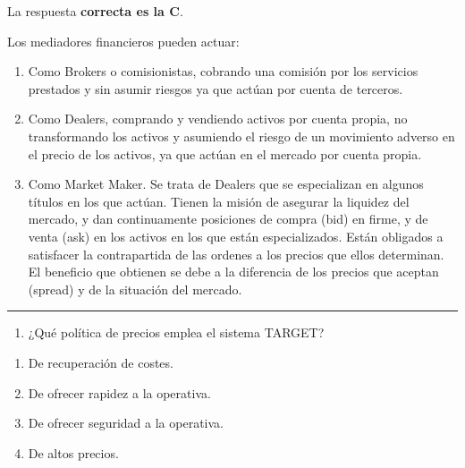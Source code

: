 \documentclass[
  letterpaper,
  DIV=11,
  numbers=noendperiod]{scrreprt}
\providecommand{\tightlist}{%
  \setlength{\itemsep}{0pt}\setlength{\parskip}{0pt}}\usepackage{longtable,booktabs,array}
\begin{document}
\begin{tcolorbox}[enhanced jigsaw, left=2mm, opacityback=0, colback=white, breakable, arc=.35mm, bottomrule=.15mm, rightrule=.15mm, toprule=.15mm, leftrule=.75mm, colframe=quarto-callout-tip-color-frame]
\begin{minipage}[t]{5.5mm}
\textcolor{quarto-callout-tip-color}{\faLightbulb}
\end{minipage}%
\begin{minipage}[t]{\textwidth - 5.5mm}

La respuesta \textbf{correcta es la C}.

Los mediadores financieros pueden actuar:

\begin{enumerate}
\def\labelenumi{\arabic{enumi}.}
\item
  Como Brokers o comisionistas, cobrando una comisión por los servicios
  prestados y sin asumir riesgos ya que actúan por cuenta de terceros.
\item
  Como Dealers, comprando y vendiendo activos por cuenta propia, no
  transformando los activos y asumiendo el riesgo de un movimiento
  adverso en el precio de los activos, ya que actúan en el mercado por
  cuenta propia.
\item
  Como Market Maker. Se trata de Dealers que se especializan en algunos
  títulos en los que actúan. Tienen la misión de asegurar la liquidez
  del mercado, y dan continuamente posiciones de compra (bid) en firme,
  y de venta (ask) en los activos en los que están especializados. Están
  obligados a satisfacer la contrapartida de las ordenes a los precios
  que ellos determinan. El beneficio que obtienen se debe a la
  diferencia de los precios que aceptan (spread) y de la situación del
  mercado.
\end{enumerate}

\end{minipage}%
\end{tcolorbox}

\begin{center}\rule{0.5\linewidth}{0.5pt}\end{center}

\begin{enumerate}
\def\labelenumi{\arabic{enumi}.}
\setcounter{enumi}{7}
\tightlist
\item
  ¿Qué política de precios emplea el sistema TARGET?
\end{enumerate}

\begin{enumerate}
\def\labelenumi{\alph{enumi})}
\item
  De recuperación de costes.
\item
  De ofrecer rapidez a la operativa.
\item
  De ofrecer seguridad a la operativa.
\item
  De altos precios.
\end{enumerate}
\end{document}
